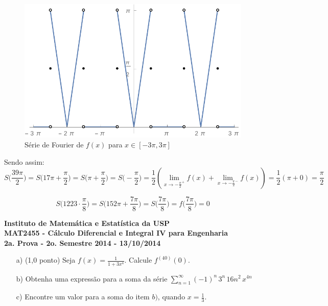\documentclass[12pt,a4paper]{article}
\begin{document}
\begin{itemize}
\begin{figure}[H]
	\centering
	\includegraphics[scale=0.7]{Fourier.pdf}  
	\caption{Série de Fourier de $f(x)$ para $x \in [-3\pi, 3\pi]$}
	\label{fig:figura1}
\end{figure}

Sendo assim:
$$ S\Big(\frac{39 \pi}{2}\Big) = S\Big(17\pi + \frac{\pi}{2}\Big) = S\Big(\pi + \frac{\pi}{2}\Big) = S\Big(- \frac{\pi}{2}\Big) = \frac{1}{2} ( \lim_{x \rightarrow - \frac{\pi}{2}^+ } f(x) + \lim_{x \rightarrow - \frac{\pi}{2}^- } f(x) ) = \frac{1}{2} ( \pi + 0) = \frac{\pi}{2} $$

$$ S\Big(1223 \cdot \frac{\pi}{8}\Big) = S\Big(152\pi + \frac{7 \pi}{8}\Big) = S\Big(\frac{7\pi}{8}\Big) = f\Big(\frac{7\pi}{8}\Big) = 0 $$

\end{itemize}

\newpage
\begin{center}
\textbf{Instituto de Matemática e Estatística da USP\\
MAT2455 - Cálculo Diferencial e Integral IV para Engenharia\\}
\textbf{2a. Prova - 2o. Semestre 2014 - 13/10/2014}
\end{center}


\begin{itemize}
	\item[a)] (1,0 ponto) Seja $ f(x) = \displaystyle\frac{1}{1+3x^4}$. Calcule $f^{(40)}(0)$.
	
	\item[b)] Obtenha uma expressão para a soma da série $\displaystyle\sum_{n=1}^\infty (-1)^n \, 3^n \, 16 n^2 \, x^{4n}$ 
	\item[c)] Encontre um valor para a soma do item $b)$, quando $x = \displaystyle\frac{1}{3}$.
\end{itemize}
\end{document}

